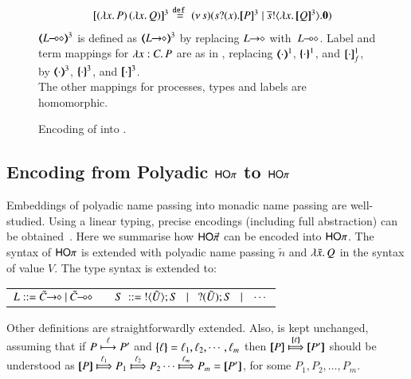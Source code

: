 \begin{figure}[t]
\[{\begin{array}{lrcll}
&  \pmap{\appl{(\abs{x}{P})}{(\abs{x}Q})}{3} &\!\!\!\!\defeq\!\!\!\!& \newsp{s}{\binp{s}{x} \pmap{P}{3} \Par  \bout{\dual{s}}{\abs{x} \pmap{Q}{3}} \inact}
	\end{array}
	}
	\]
	{\small $\tmap{\lhot{L}}{3}$ is defined as
	$\tmap{\shot{L}}{3}$
	by replacing $L\!\! \rightarrow\!\! \diamond$ with~$L\!\! \multimap\!\! \diamond$. 
	Label and term mappings for $\lambda x:C.\,P$  
are %
as in , replacing 
$(\!\!\langle\cdot\rangle\!\!)^{1}$,
$\{\!\!\{\cdot\}\!\!\}^{1}$, and 
$[\!\![\cdot]\!\!]^1_f$, by  
$(\!\!\langle\cdot\rangle\!\!)^{3}$,
$\{\!\!\{\cdot\}\!\!\}^{3}$, and 
$[\!\![\cdot]\!\!]^3$. \\
The other mappings for processes, types and labels are  homomorphic.} \\
\caption{\label{f:enc:hopip_to_hopi} 
Encoding of \HOpp into \HOp.
}
\Hlinefig
\end{figure} 

\subsection{Encoding from Polyadic $\mathsf{HO}\pi$ to $\mathsf{HO}\pi$}
\label{subsec:pho}
\noi Embeddings of polyadic name passing into monadic name passing are
well-studied. %
Using a linear typing, precise
encodings (including full abstraction) can be obtained~\cite{Yoshida96}.
Here we summarise how $\mathsf{HO}{\vec{\pi}}$ can be encoded into $\mathsf{HO}\pi$. 
The syntax of 
$\mathsf{HO}\pi$ is extended %
with
polyadic name passing $\tilde{n}$ and $\lambda \tilde{x}.\,Q$ in the syntax 
of value $V$. The type syntax is extended to: 
%
\begin{center}
\begin{tabular}{c}
$
L ::= \shot{\tilde{C}} \ | \ \lhot{\tilde{C}}
\quad\quad S \ ::= \  \btout{\tilde{U}} S \bnfbar \btinp{\tilde{U}} S \bnfbar \cdots 
$
\end{tabular}
\end{center}
%
Other definitions are straightforwardly extended. 
Also,  is kept unchanged, 
assuming that if 
$P \stackrel{\ell}{\longmapsto} P'$ and $\{\!\!\{\ell\}\!\!\} = \ell_1, \ell_2,  \cdots, \ell_m$ then
$\map{P} \Hby{\mapa{\ell}} \map{P'}$
should be understood as
$\map{P} \Hby{\ell_1} P_1 \Hby{\ell_2} P_2 \cdots \Hby{\ell_m} P_m =  \map{P'}$,
for some
$P_1, P_2, \ldots, P_m$.


